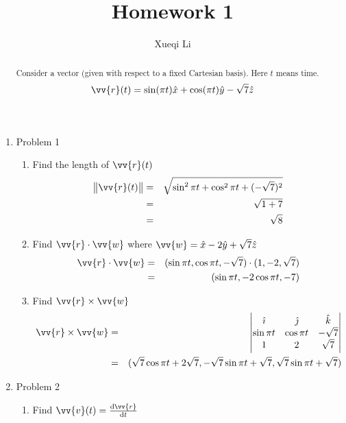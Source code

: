 \documentclass[aps,prl,reprint]{revtex4-1}
\begin{document}
\title{Homework 1}
\author{Xueqi Li}
\noaffiliation

\begin{abstract}
Consider a vector (given with respect to a fixed Cartesian basis). Here $t$ means time.
\[
\vv{r}(t) = \sin(\pi t)\hat{x} + \cos(\pi t)\hat{y} - \sqrt{7}\hat{z}
\]
\end{abstract}

\maketitle

\begin{enumerate}
\item Problem 1
\begin{enumerate}
\item Find the length of $\vv{r}(t)$
\begin{eqnarray*}
    \norm{\vv{r}(t)} & = & \sqrt{\sin^2\pi t + \cos^2\pi t + (-\sqrt{7})^2}  \\
     & = & \sqrt{1+7} \\
     & = & \sqrt{8}
\end{eqnarray*}
\item Find $\vv{r} \cdot \vv{w}$ where $\vv{w} = \hat{x} -2\hat{y}+\sqrt{7}\hat{z}$
\begin{eqnarray*}
    \vv{r} \cdot \vv{w} &=& (\sin\pi t , \cos\pi t ,- \sqrt{7}) \cdot (1,-2,\sqrt{7})\\
    &=& (\sin\pi t, -2\cos{\pi t}, -7)
\end{eqnarray*}
\item Find $\vv{r} \times \vv{w}$
\begin{eqnarray*}
    \vv{r} \times \vv{w} &=&
        \begin{vmatrix}
            \hat{\imath} & \hat{\jmath} & \hat{k} \\
            \sin\pi t & \cos\pi t & - \sqrt{7} \\
            1 & 2 & \sqrt{7}
    \end{vmatrix} \\
    &=& (\sqrt{7}\cos\pi t + 2\sqrt{7},-\sqrt{7}\sin\pi t +\sqrt{7}, \sqrt{7}\sin\pi t + \sqrt{7} )
\end{eqnarray*}
\end{enumerate}
\item Problem 2
\begin{enumerate}
\item Find $\vv{v}(t) = \frac{\mathrm{d}\vv{r}}{\mathrm{d}t}$

\end{enumerate}
\end{enumerate}
\end{document}
